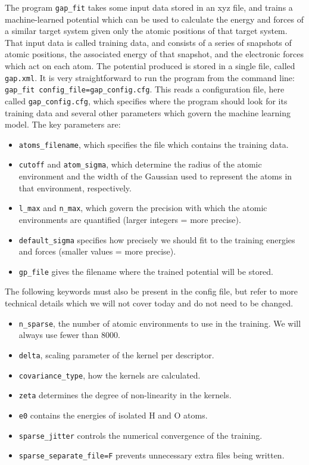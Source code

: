 \documentclass{article}
\begin{document}
The program \verb|gap_fit| takes some input data stored in an xyz file, and trains a machine-learned potential which can be used to calculate the energy and forces of a similar target system given only the atomic positions of that target system. That input data is called training data, and consists of a series of snapshots of atomic positions, the associated energy of that snapshot, and the electronic forces which act on each atom. The potential produced is stored in a single file, called \verb|gap.xml|. It is very straightforward to run the program from the command line: \verb|gap_fit config_file=gap_config.cfg|. This reads a configuration file, here called \verb|gap_config.cfg|, which specifies where the program should look for its training data and several other parameters which govern the machine learning model. The key parameters are:
\begin{itemize}

\item \verb|atoms_filename|, which specifies the file which contains the training data.
\item \verb|cutoff| and \verb|atom_sigma|, which determine the radius of the atomic environment and the width of the Gaussian used to represent the atoms in that environment, respectively.
\item \verb|l_max| and \verb|n_max|, which govern the precision with which the atomic environments are quantified (larger integers = more precise).
\item \verb|default_sigma| specifies how precisely we should fit to the training energies and forces (smaller values = more precise).
\item \verb|gp_file| gives the filename where the trained potential will be stored.

\end{itemize}

The following keywords must also be present in the config file, but refer to more technical details which we will not cover today and do not need to be changed.

\begin{itemize}
\item \verb|n_sparse|, the number of atomic environments to use in the training. We will always use fewer than 8000.
\item \verb|delta|, scaling parameter of the kernel per descriptor.
\item \verb|covariance_type|, how the kernels are calculated.
\item \verb|zeta| determines the degree of non-linearity in the kernels.
\item \verb|e0| contains the energies of isolated H and O atoms.
\item \verb|sparse_jitter| controls the numerical convergence of the training.
\item \verb|sparse_separate_file=F| prevents unnecessary extra files being written. 
\end{itemize}
\end{document}
